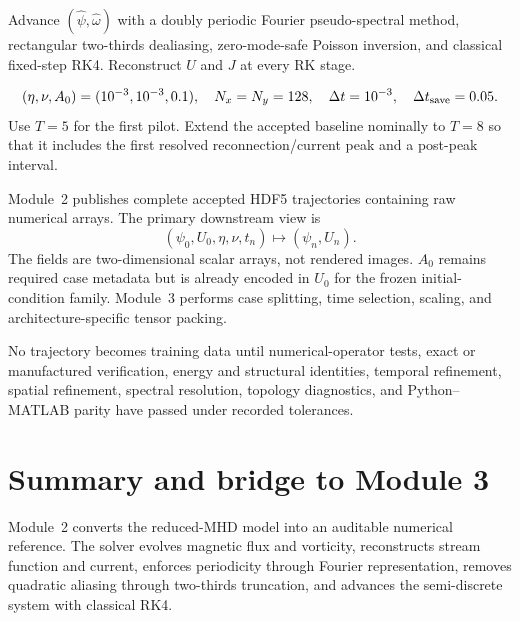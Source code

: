 \documentclass[11pt]{article}
\begin{document}
\begin{conventionbox}
Advance $(\widehat\psi,\widehat\omega)$ with a doubly periodic Fourier pseudo-spectral method, rectangular two-thirds dealiasing, zero-mode-safe Poisson inversion, and classical fixed-step RK4. Reconstruct $U$ and $J$ at every RK stage.
\end{conventionbox}

\begin{conventionbox}[\,: baseline]
\[
(\eta,\nu,A_0)=(10^{-3},10^{-3},0.1),\quad
N_x=N_y=128,\quad
\Delta t=10^{-3},\quad
\Delta t_{\rm save}=0.05.
\]
Use $T=5$ for the first pilot. Extend the accepted baseline nominally to $T=8$ so that it includes the first resolved reconnection/current peak and a post-peak interval.
\end{conventionbox}

\begin{conventionbox}
Module~2 publishes complete accepted HDF5 trajectories containing raw numerical arrays. The primary downstream view is
\[
(\psi_0,U_0,\eta,\nu,t_n)\longmapsto(\psi_n,U_n).
\]
The fields are two-dimensional scalar arrays, not rendered images. $A_0$ remains required case metadata but is already encoded in $U_0$ for the frozen initial-condition family. Module~3 performs case splitting, time selection, scaling, and architecture-specific tensor packing.
\end{conventionbox}

\begin{conventionbox}[\,: acceptance]
No trajectory becomes training data until numerical-operator tests, exact or manufactured verification, energy and structural identities, temporal refinement, spatial refinement, spectral resolution, topology diagnostics, and Python--MATLAB parity have passed under recorded tolerances.
\end{conventionbox}

\section{Summary and bridge to Module 3}
\label{sec:summary}

Module~2 converts the reduced-MHD model into an auditable numerical reference. The solver evolves magnetic flux and vorticity, reconstructs stream function and current, enforces periodicity through Fourier representation, removes quadratic aliasing through two-thirds truncation, and advances the semi-discrete system with classical RK4.
\end{document}
